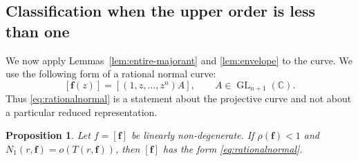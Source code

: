 \documentclass[12pt,letterpaper,reqno]{amsart}
\newtheorem{prop}[thm]{Proposition}
\theoremstyle{definition}
\numberwithin{equation}{section}
\newcommand{\C}{\mathbb C}
\newcommand{\fv}{\bm f}
\begin{document}
\subsection{Classification when the upper order is less than one}

We now apply Lemmas~\ref{lem:entire-majorant} and
\ref{lem:envelope} to the curve. We use the following form of a
rational normal curve:
\begin{equation}\label{eq:rationalnormal}
 [\fv(z)]
 =
 [(1,z,\ldots,z^{n})A],
 \qquad
 A\in\operatorname{GL}_{n+1}(\C).
\end{equation}
Thus \eqref{eq:rationalnormal} is a statement about the projective
curve and not about a particular reduced representation.

\begin{prop}\label{prop:small-order}
Let \(f=[\fv]\) be linearly non-degenerate. If \(\rho(\fv)<1\) and
\(N_1(r,\fv)=o(T(r,\fv))\), then \([\fv]\) has the form
\eqref{eq:rationalnormal}.
\end{prop}
\end{document}
